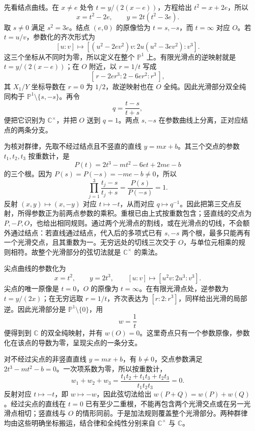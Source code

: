 \begin{solution}
	先看结点曲线。在 \(x\ne e\) 处令 \(t=y/(2(x-e))\)，方程给出 \(t^2=x+2e\)，所以
	\[
		x=t^2-2e,\qquad y=2t(t^2-3e).
	\]
	取 \(s\ne0\) 满足 \(s^2=3e\)。结点 \((e,0)\) 的原像恰为 \(t=s,-s\)，而 \(t=\infty\) 对应 \(O\)。若 \(t=u/v\)，参数化的齐次形式为
	\[
		[u:v]\longmapsto
		[(u^2-2ev^2)v:2u(u^2-3ev^2):v^3].
	\]
	这三个坐标从不同时为零，所以定义在整个 \(\mathbb P^1\) 上。有限光滑点的逆映射就是 \(t=y/(2(x-e))\)；在 \(O\) 附近，以 \(r=1/t\) 写成
	\[
		[\,r-2er^3:2-6er^2:r^3\,],
	\]
	其 \(X_1/Y\) 坐标导数在 \(r=0\) 为 \(1/2\)，故逆映射也在 \(O\) 全纯。因此光滑部分双全纯同构于 \(\mathbb P^1\setminus\{s,-s\}\)。再令
	\[
		q=\frac{t-s}{t+s},
	\]
	便把它识别为 \(\mathbb C^\times\)，并把 \(O\) 送到 \(q=1\)。两点 \(s,-s\) 在参数曲线上分离，正对应结点的两条分支。

	为核对群律，先取不经过结点且不竖直的直线 \(y=mx+b\)。其三个交点的参数 \(t_1,t_2,t_3\) 按重数计，是
	\[
		P(t)=2t^3-mt^2-6et+2me-b
	\]
	的三个根。因为 \(P(s)=P(-s)=-me-b\ne0\)，所以
	\[
		\prod_{j=1}^3\frac{t_j-s}{t_j+s}
		=\frac{P(s)}{P(-s)}=1.
	\]
	反射 \((x,y)\mapsto(x,-y)\) 对应 \(t\mapsto-t\)，从而对应 \(q\mapsto q^{-1}\)。因此把第三交点反射，所得参数正为前两点参数的乘积。重根已由上式按重数包含；竖直线的交点为 \(P,-P,O\)，也给出相同规则。通过两个光滑点的割线，或在光滑点的切线，不会额外通过结点：若直线通过结点，代入后的多项式已有 \(s,-s\) 两个根，最多只能再有一个光滑交点，且其重数为一。无穷远处的切线三次交于 \(O\)，与单位元相乘的规则相符。故整个光滑部分的弦切法就是 \(\mathbb C^\times\) 的乘法。

	尖点曲线的参数化为
	\[
		x=t^2,\qquad y=2t^3,\qquad
		[u:v]\longmapsto[u^2v:2u^3:v^3].
	\]
	尖点的唯一原像是 \(t=0\)，\(O\) 的原像为 \(t=\infty\)。在有限光滑点处，逆参数为 \(t=y/(2x)\)；在无穷远取 \(r=1/t\)，齐次表达为 \([r:2:r^3]\)，同样给出光滑的局部逆。因此光滑部分是 \(\mathbb P^1\setminus\{0\}\)，用
	\[
		w=\frac1t
	\]
	便得到到 \(\mathbb C\) 的双全纯映射，并有 \(w(O)=0\)。这里奇点只有一个参数原像，参数化在该点的导数为零，呈现尖点的一条分支。

	对不经过尖点的非竖直直线 \(y=mx+b\)，有 \(b\ne0\)，交点参数满足 \(2t^3-mt^2-b=0\)。一次项系数为零，所以按重数计，
	\[
		w_1+w_2+w_3
		=\frac{t_1t_2+t_1t_3+t_2t_3}{t_1t_2t_3}=0.
	\]
	反射对应 \(t\mapsto-t\)，即 \(w\mapsto-w\)，因此弦切法给出 \(w(P+Q)=w(P)+w(Q)\)。经过尖点的直线在 \(t=0\) 已有至少二重根，不能再包含两个光滑交点或在另一光滑点相切；竖直线与 \(O\) 的情形同前。于是加法规则覆盖整个光滑部分。两种群律均由这些明确坐标搬运，结合律和全纯性分别来自 \(\mathbb C^\times\) 与 \(\mathbb C\)。
\end{solution}